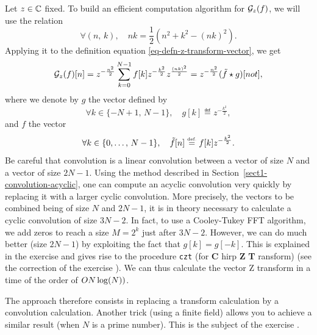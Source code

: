    Let $ z \in \CC $ fixed. To build an efficient computation algorithm for $ \Gg_z (f) $, we will use the relation
\begin{equation*}
\forall (n, \, k), \quad nk = \frac{1}{2} \left(n^2 + k^2 - (nk)^2 \right).
\end{equation*}
Applying it to the definition equation \eqref{eq-defn-z-transform-vector}, we get
\begin{equation*}
\Gg_z (f) [n] = z^{- \frac{n^2}{2}} \sum_{k = 0}^{N-1}{f [k] z^{- \frac{k^2}{2}} z^{\frac{(nk)^2}{2}}} = z^{- \frac{n^2}{2}} (\wt{f} \star g) [not],
\end{equation*}
where we denote by $ g $ the vector defined by
\begin{equation*}
\forall k \in \{- N + 1, \, N-1 \}, \quad g [k] \eqdef z^{- \frac{k^2}{2}},
\end{equation*}
and $ f $ the vector
\begin{equation*}
\forall k \in \{0, \ldots, \, N-1 \}, \quad \wt{f}[n] \eqdef f [k] z^{- \frac{k^2}{2} }.
\end{equation*}
 Be careful that convolution is a linear convolution between a vector of size $ N $ and a vector of size $ 2N-1 $. Using the method described in Section~\ref{sect1-convolution-acyclic}, one can compute an acyclic convolution very quickly by replacing it with a larger cyclic convolution. More precisely, the vectors to be combined being of size $ N $ and $ 2N-1 $, it is in theory necessary to calculate a cyclic convolution of size $ 3N-2 $.  In fact, to use a Cooley-Tukey  FFT algorithm, we add zeros to reach a size $ M = 2^k $ just after $ 3N-2 $. However, we can do much better (size $ 2N-1 $) by exploiting the fact that $ g [k] = g [-k] $. This is explained in the exercise  and gives rise to the procedure \Matlab{} \texttt{czt} (for \textbf{C} hirp \textbf{Z} \textbf{T } ransform) (see the correction of the exercise ). We can thus calculate the vector Z transform in a time of the order of $ \grdo (N \log (N)) $.
 
 
The  approach therefore consists in replacing a transform calculation by a convolution calculation. Another trick (using a finite field) allows you to achieve a similar result (when $ N $ is a prime number). This is the subject of the exercise .
 

